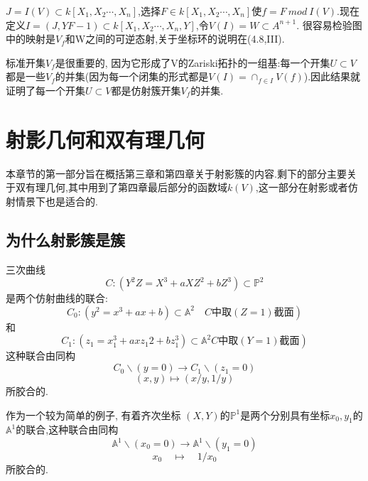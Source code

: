 \documentclass[UTF8]{book}
\begin{document}
		$J=I(V)\subset k[X_{1},X_{2}\cdots,X_{n}]$,选择$F\in k[X_{1},X_{2}\cdots,X_{n}]$使$f=F \ mod \ I(V)$.现在定义$I=(J,YF-1)\subset k[X_{1},X_{2}\cdots,X_{n},Y]$,令$V(I)=W\subset A^{n+1}.$
		很容易检验图中的映射是$V_{f}$和W之间的可逆态射,关于坐标环的说明在(4.8,III).

		标准开集$V_{f}$是很重要的, 因为它形成了V的Zariski拓扑的一组基:每一个开集$U\subset V$都是一些$V_{f}$的并集(因为每一个闭集的形式都是$V(I)=\cap_{f \in I} V(f)$).因此结果就证明了每一个开集$U\subset V$都是仿射簇开集$V_{f}$的并集.



\chapter{射影几何和双有理几何}
	本章节的第一部分旨在概括第三章和第四章关于射影簇的内容.剩下的部分主要关于双有理几何,其中用到了第四章最后部分的函数域$ k(V) $,这一部分在射影或者仿射情景下也是适合的.
	
	\setcounter{section}{-1}
	\section{为什么射影簇是簇}
		三次曲线
		\begin{equation*}
		C :\left( Y ^{2} Z = X ^{3}+ aXZ ^{2}+ bZ ^{3}\right) \subset \mathbb{P} ^{2}
		\end{equation*}
		是两个仿射曲线的联合:
		\begin{equation*}
		\left. C _{0}:\left( y ^{2}= x ^{3}+ ax + b \right) \subset \mathbb{A} ^{2} \quad  C \text{中取} (Z = 1) \text{截面}\right)
		\end{equation*}
		和
		\begin{equation*}
		\left. C _{1}:\left( z _{1}= x _{1}^{3}+ axz _{1} 2+ bz _{1}^{3}\right) \subset \mathbb{A} ^{2}   C \text{中取} (Y = 1) \text{截面}\right)
		\end{equation*}
		这种联合由同构
		\begin{equation*}
		C _{0} \backslash( y =0) \longrightarrow  C _{1} \backslash\left( z _{1}=0\right)
		\end{equation*}
		\begin{equation*}
		( x , y ) \mapsto( x / y , 1 / y )
		\end{equation*}
		所胶合的.
		
		
		作为一个较为简单的例子, 有着齐次坐标 $( X , Y )$的$\mathbb{P}^{1}$是两个分别具有坐标$ x_{0},y_{1} $的 $\mathbb{A}^{1}$的联合,这种联合由同构
		\begin{equation*}
		\mathbb{A}^{1} \backslash\left(x_{0}=0\right)\rightarrow \mathbb{A}^{1} \backslash\left(y_{1}=0\right)
		\end{equation*}
		\begin{equation*}
		x _{0} \quad \mapsto \quad 1 / x _{0}
		\end{equation*}
		所胶合的.
		
\end{document}
